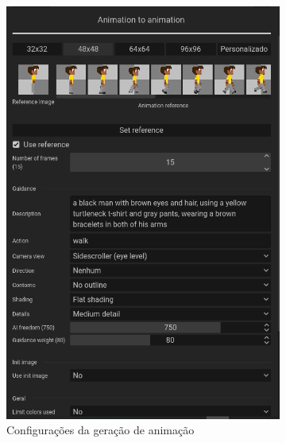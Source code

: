 \begin{figure}[htbp]
    \centering
    \caption{\small Processo da utilização 7 da ferramenta de animação do PixelLab em julho/2025}
    \label{fig:pixelLabAnimacao7}

    \begin{subfigure}{0.6\linewidth}
        \includegraphics[width=1\linewidth]{figs/pixelLab/dia4/tela1.PNG}
        \caption{\small Configurações da geração de animação}
        \label{fig:pixelLabAnimacao7a}
    \end{subfigure}
    \begin{subfigure}{0.35\linewidth}

\end{subfigure}
\end{figure}
